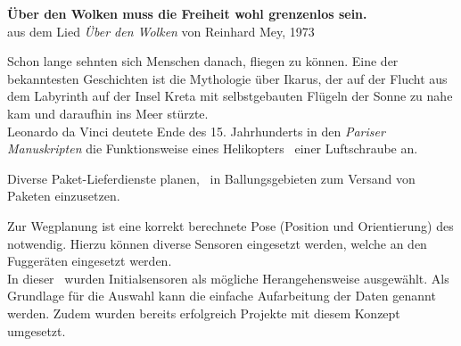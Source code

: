 

\vspace{1cm}
\begin{center}
\textbf{\grqq Über den Wolken muss die Freiheit wohl grenzenlos sein.\grqq}\\
\vspace{0.5cm}
aus dem Lied \textit{Über den Wolken} von Reinhard Mey, 1973 \cite{Einl1}
\end{center}
\vspace{1cm}


Schon lange sehnten sich Menschen danach, fliegen zu können. Eine der bekanntesten Geschichten ist die Mythologie über Ikarus, der auf der Flucht aus dem Labyrinth auf der Insel Kreta mit selbstgebauten Flügeln der Sonne zu nahe kam und daraufhin ins Meer stürzte. \\
Leonardo da Vinci deutete Ende des 15. Jahrhunderts in den \textit{Pariser Manuskripten} die Funktionsweise eines Helikopters \bzw\ einer Luftschraube an. 

Diverse Paket-Lieferdienste planen, \Quad\ in Ballungsgebieten zum Versand von Paketen einzusetzen. 

Zur Wegplanung ist eine korrekt berechnete Pose (Position und Orientierung) des \Quad[s] notwendig. Hierzu können diverse Sensoren eingesetzt werden, welche an den Fuggeräten eingesetzt werden.\\
In dieser \Arbeit\ wurden Initialsensoren als mögliche Herangehensweise ausgewählt. Als Grundlage für die Auswahl kann die einfache Aufarbeitung der Daten genannt werden. Zudem wurden bereits erfolgreich Projekte mit diesem Konzept umgesetzt. 






\vspace{3.5cm}







